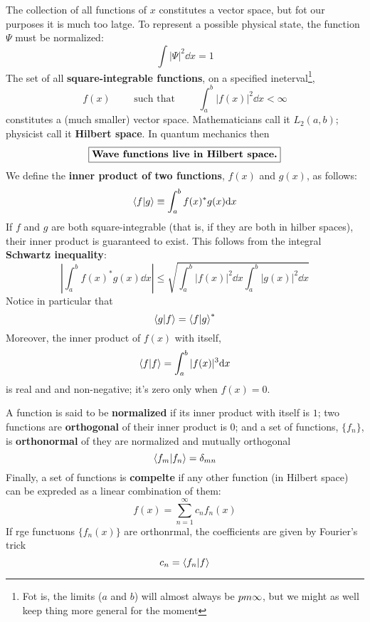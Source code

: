 The collection of all functions of $x$ constitutes a vector space, but fot our purposes it is much too latge. To represent a possible physical state, the function $\Psi$ must be normalized:
$$\int |\Psi|^2\dd x=1$$ The set of all \textbf{square-integrable functions}, on a specified ineterval\footnote{Fot is, the limits ($a$ and $b$) will almost always be $\\pm\infty$, but we might as well keep thing more general for the moment},
\begin{equation}\label{3.4}
	f(x)\qquad \mbox{ such that  }\qquad \int_a^b |f(x)|^2\dd x<\infty
\end{equation}
constitutes a (much smaller) vector space. Mathematicians call it $L_2(a,b)$; physicist call it \textbf{Hilbert space}. In quantum mechanics then
\begin{equation}\label{3.5}
	\boxed{\mbox{\textbf{Wave functions live in Hilbert space.}}}
\end{equation}
We define the \textbf{inner product of two functions}, $f(x)$ and $g(x)$, as follows:
\begin{equation}\label{3.6}
	\braket{f}{g}\equiv\int_a^b f(x)^*g(x)\dd x
\end{equation}
If $f$ and $g$ are both square-integrable (that is, if they are both in hilber spaces), their inner product is guaranteed to exist. This follows from the integral \textbf{Schwartz inequality}:
\begin{equation}\label{3.7}
	\left|\int_a^bf(x)^*g(x)\dd x\right|\leq \sqrt{\int_a^b|f(x)|^2\dd x\int_a^b|g(x)|^2\dd x}
\end{equation}
Notice in particular that
\begin{equation}\label{3.8}
	\braket{g}{f}=\braket{f}{g}^*
\end{equation}
Moreover, the inner product of $f(x)$ with itself,
\begin{equation}\label{3.9}
	\braket{f}{f}=\int_a^b|f(x)|^3\dd x
\end{equation}
is real and and non-negative; it's zero only when $f(x)=0$. 

A function is said to be \textbf{normalized} if its inner product with itself is $1$; two functions are \textbf{orthogonal} of their inner product is $0$; and a set of functions, $\{f_n\}$, is \textbf{orthonormal} of they are normalized and mutually orthogonal
\begin{equation}\label{3.10}
	\braket{f_m}{f_n}=\delta_{mn}
\end{equation}
Finally, a set of functions is \textbf{compelte} if any other function (in Hilbert space) can be expreded as a linear combination of them:
\begin{equation}\label{3.11}
	f(x)=\sum_{n=1}^\infty c_nf_n(x)
\end{equation}
If rge functuons $\{f_n(x)\}$ are orthonrmal, the coefficients are given by Fourier's trick
\begin{equation}\label{3.12}
	c_n=\braket{f_n}{f}
\end{equation}


